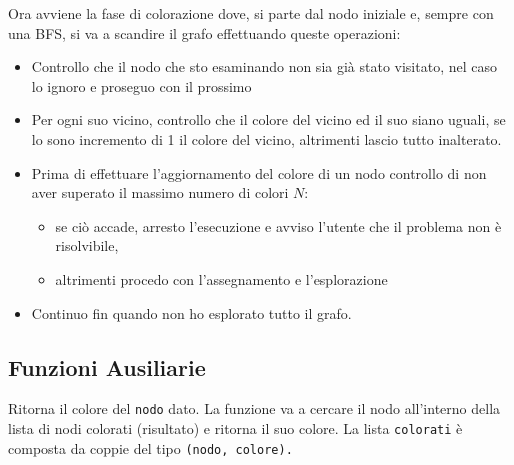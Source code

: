 \documentclass[11pt]{article}
\providecommand{\tightlist}{%
      \setlength{\itemsep}{0pt}\setlength{\parskip}{0pt}}
\begin{document}
Ora avviene la fase di colorazione dove, si parte dal nodo iniziale e,
sempre con una BFS, si va a scandire il grafo effettuando queste
operazioni:

\begin{itemize}
\tightlist
\item
  Controllo che il nodo che sto esaminando non sia già stato visitato,
  nel caso lo ignoro e proseguo con il prossimo
\item
  Per ogni suo vicino, controllo che il colore del vicino ed il suo
  siano uguali, se lo sono incremento di 1 il colore del vicino,
  altrimenti lascio tutto inalterato.
\item
  Prima di effettuare l'aggiornamento del colore di un nodo controllo di
  non aver superato il massimo numero di colori \(N\):

  \begin{itemize}
  \tightlist
  \item
    se ciò accade, arresto l'esecuzione e avviso l'utente che il
    problema non è risolvibile,
  \item
    altrimenti procedo con l'assegnamento e l'esplorazione
  \end{itemize}
\item
  Continuo fin quando non ho esplorato tutto il grafo.
\end{itemize}

    \hypertarget{funzioni-ausiliarie}{%
\subsection{\texorpdfstring{Funzioni Ausiliarie
}{Funzioni Ausiliarie }}\label{funzioni-ausiliarie}}

    Ritorna il colore del \texttt{nodo} dato. La funzione va a cercare il
nodo all'interno della lista di nodi colorati (risultato) e ritorna il
suo colore. La lista \texttt{colorati} è composta da coppie del tipo
\texttt{(nodo,\ colore).}
\end{document}
